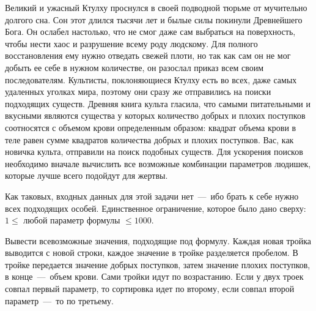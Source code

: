 Великий и ужасный Ктулху проснулся в своей подводной тюрьме от мучительно долгого сна. 
Сон этот длился тысячи лет и былые силы покинули Древнейшего Бога. 
Он ослабел настолько, что не смог даже сам выбраться на поверхность, чтобы нести хаос и разрушение всему роду людскому. 
Для полного восстановления ему нужно отведать свежей плоти, но так как сам он не мог добыть ее себе в нужном количестве, он разослал приказ всем своим последователям. 
Культисты, поклоняющиеся Ктулху есть во всех, даже самых удаленных уголках мира, поэтому они сразу же отправились на поиски подходящих существ. 
Древняя книга культа гласила, что самыми питательными и вкусными являются существа у которых количество добрых и плохих поступков соотносятся с объемом крови определенным образом: 
квадрат объема крови в теле равен сумме квадратов количества добрых и плохих поступков. 
Вас, как новичка культа, отправили на поиск подобных существ. Для ускорения поисков необходимо вначале вычислить все возможные комбинации параметров людишек, 
которые лучше всего подойдут для жертвы.

\InputFile
\noindent
Как таковых, входных данных для этой задачи нет~---~ибо брать к себе нужно всех подходящих особей. Единственное ограничение, которое было дано сверху: 
$1 \leq $ любой параметр формулы $ \leq 1000$. 

\OutputFile
\noindent

Вывести всевозможные значения, подходящие под формулу. Каждая новая тройка выводится с новой строки, каждое значение в тройке разделяется пробелом. 
В тройке передается значение добрых поступков, затем значение плохих поступков, в конце~---~объем крови.
Сами тройки идут по возрастанию. Если у двух троек совпал первый параметр, то сортировка идет по второму, если совпал второй параметр~---~то по третьему.

\SAMPLES